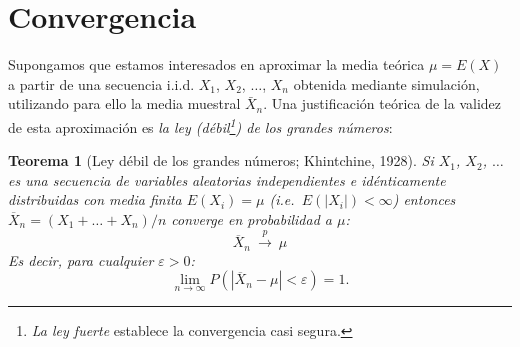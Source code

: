 \documentclass[
]{book}
\theoremstyle{break}
\newtheorem{theorem}{Teorema}[chapter]
\theoremstyle{nonumberplain}
\begin{document}
\hypertarget{convergencia}{%
\section{Convergencia}\label{convergencia}}

Supongamos que estamos interesados en aproximar la media teórica \(\mu = E\left( X\right)\) a partir de una secuencia i.i.d. \(X_{1}\), \(X_{2}\), \(\ldots\), \(X_{n}\) obtenida mediante simulación, utilizando para ello la media muestral \(\bar{X}_{n}\).
Una justificación teórica de la validez de esta aproximación es \emph{la ley (débil\footnote{\emph{La ley fuerte} establece la convergencia casi segura.}) de los grandes números}:

\begin{theorem}[Ley débil de los grandes números; Khintchine, 1928]
\protect\hypertarget{thm:khinchine}{}\label{thm:khinchine}
Si \(X_{1}\), \(X_{2}\), \(\ldots\) es una secuencia de variables aleatorias independientes e idénticamente distribuidas con media finita \(E\left( X_{i}\right) =\mu\) (i.e.~\(E\left( \left\vert X_{i} \right\vert \right) < \infty\)) entonces \(\overline{X}_{n}=\left( X_{1}+\ldots +X_{n}\right) /n\)
converge en probabilidad a \(\mu\): \[\overline{X}_{n}\ \overset{p}{ \longrightarrow }\ \mu\]
Es decir, para cualquier \(\varepsilon >0\):
\[\lim\limits_{n\rightarrow \infty }P\left( \left\vert \overline{X}_{n}-\mu
\right\vert <\varepsilon \right) = 1.\]
\end{theorem}
\end{document}

